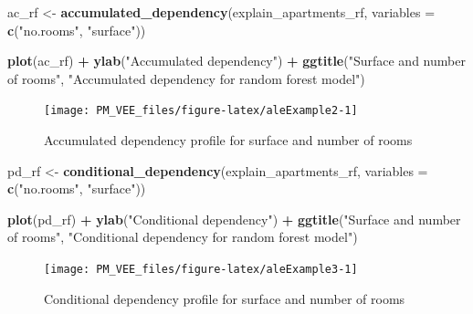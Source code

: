 \documentclass[12pt,]{krantz}
\newenvironment{Shaded}{\begin{snugshade}}{\end{snugshade}}
\newcommand{\DataTypeTok}[1]{\textcolor[rgb]{0.13,0.29,0.53}{#1}}
\newcommand{\KeywordTok}[1]{\textcolor[rgb]{0.13,0.29,0.53}{\textbf{#1}}}
\newcommand{\NormalTok}[1]{#1}
\newcommand{\OperatorTok}[1]{\textcolor[rgb]{0.81,0.36,0.00}{\textbf{#1}}}
\newcommand{\StringTok}[1]{\textcolor[rgb]{0.31,0.60,0.02}{#1}}
\begin{document}
\begin{Shaded}
\begin{Highlighting}[]
\NormalTok{ac_rf <-}\StringTok{ }\KeywordTok{accumulated_dependency}\NormalTok{(explain_apartments_rf, }\DataTypeTok{variables =} \KeywordTok{c}\NormalTok{(}\StringTok{"no.rooms"}\NormalTok{, }\StringTok{"surface"}\NormalTok{))}

\KeywordTok{plot}\NormalTok{(ac_rf) }\OperatorTok{+}\StringTok{ }\KeywordTok{ylab}\NormalTok{(}\StringTok{"Accumulated dependency"}\NormalTok{) }\OperatorTok{+}
\StringTok{  }\KeywordTok{ggtitle}\NormalTok{(}\StringTok{"Surface and number of rooms"}\NormalTok{, }\StringTok{"Accumulated dependency for random forest model"}\NormalTok{) }
\end{Highlighting}
\end{Shaded}

\begin{figure}

{\centering \texttt{[image: PM\_VEE\_files/figure-latex/aleExample2-1]} 

}

\caption{Accumulated dependency profile for surface and number of rooms}\label{fig:aleExample2}
\end{figure}

\begin{Shaded}
\begin{Highlighting}[]
\NormalTok{pd_rf <-}\StringTok{ }\KeywordTok{conditional_dependency}\NormalTok{(explain_apartments_rf, }\DataTypeTok{variables =} \KeywordTok{c}\NormalTok{(}\StringTok{"no.rooms"}\NormalTok{, }\StringTok{"surface"}\NormalTok{))}

\KeywordTok{plot}\NormalTok{(pd_rf) }\OperatorTok{+}\StringTok{ }\KeywordTok{ylab}\NormalTok{(}\StringTok{"Conditional dependency"}\NormalTok{) }\OperatorTok{+}
\StringTok{  }\KeywordTok{ggtitle}\NormalTok{(}\StringTok{"Surface and number of rooms"}\NormalTok{, }\StringTok{"Conditional dependency for random forest model"}\NormalTok{) }
\end{Highlighting}
\end{Shaded}

\begin{figure}

{\centering \texttt{[image: PM\_VEE\_files/figure-latex/aleExample3-1]} 

}

\caption{Conditional dependency profile for surface and number of rooms}\label{fig:aleExample3}
\end{figure}
\end{document}
